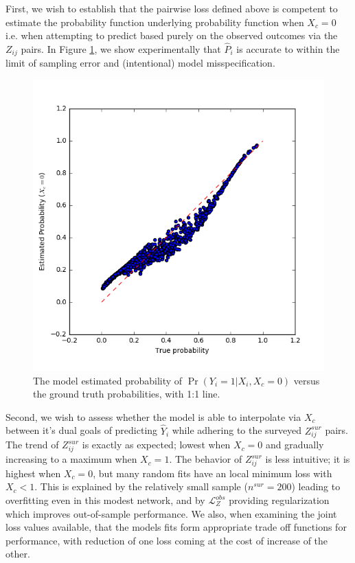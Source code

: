         First, we wish to establish that the pairwise loss defined above is competent to estimate the probability function underlying probability function when $X_c = 0$ i.e. when attempting to predict based purely on the observed outcomes via the $Z_{ij}$ pairs.  In Figure \ref{fig:sm_synthetic_p_fit}, we show experimentally that $\hat{P}_i$ is accurate to within the limit of sampling error and (intentional) model misspecification.
        
        \begin{figure}
            \centering
            \includegraphics{fig_softmono/synthetic_p_fit.png}
            \caption{The model estimated probability of $\Pr(Y_i = 1 | X_i, X_c = 0)$ versus the ground truth probabilities, with 1:1 line.}
            \label{fig:sm_synthetic_p_fit}
        \end{figure}
        
        Second, we wish to assess whether the model is able to interpolate via $X_c$ between it's dual goals of predicting $\hat{Y}_i$ while adhering to the surveyed $Z_{ij}^{sur}$ pairs.  The trend of $Z_{ij}^{sur}$ is exactly as expected; lowest when $X_c = 0$ and gradually increasing to a maximum when $X_c = 1$.  The behavior of $Z_{ij}^{sur}$ is less intuitive; it is highest when $X_c = 0$, but many random fits have an local minimum loss with $X_c < 1$.  This is explained by the relatively small sample ($n^{sur} = 200$) leading to overfitting even in this modest network, and by $\mathcal{L}_Z^{obs}$ providing regularization which improves out-of-sample performance.  We also, when examining the joint loss values available, that the models fits form appropriate trade off functions for performance, with reduction of one loss coming at the cost of increase of the other. 
        
